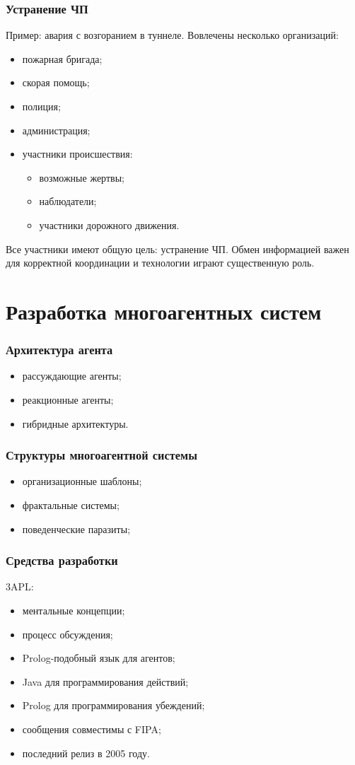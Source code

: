 \documentclass{beamer}
\begin{document}
\begin{frame}
  \frametitle{Устранение ЧП}
  Пример: авария с возгоранием в туннеле. Вовлечены несколько организаций:
  \begin{itemize}
    \item пожарная бригада;
    \item скорая помощь;
    \item полиция;
    \item администрация;
    \item участники происшествия:
      \begin{itemize}
        \item возможные жертвы;
        \item наблюдатели;
        \item участники дорожного движения.
      \end{itemize}
  \end{itemize}

  Все участники имеют общую цель: устранение ЧП. Обмен информацией важен для корректной
  координации и технологии играют существенную роль.
\end{frame}

\section{Разработка многоагентных систем}

\begin{frame}
  \frametitle{Архитектура агента}
  \begin{itemize}
    \item рассуждающие агенты;
    \item реакционные агенты;
    \item гибридные архитектуры.
  \end{itemize}
\end{frame}

\begin{frame}
  \frametitle{Структуры многоагентной системы}
  \begin{itemize}
    \item организационные шаблоны;
    \item фрактальные системы;
    \item поведенческие паразиты;
  \end{itemize}
\end{frame}

\begin{frame}
  \frametitle{Средства разработки}
  3APL:
  \begin{itemize}
    \item ментальные концепции;
    \item процесс обсуждения;
    \item Prolog-подобный язык для агентов;
    \item Java для программирования действий;
    \item Prolog для программирования убеждений;
    \item сообщения совместимы с FIPA;
    \item последний релиз в 2005 году.
  \end{itemize}
\end{frame}
\end{document}
